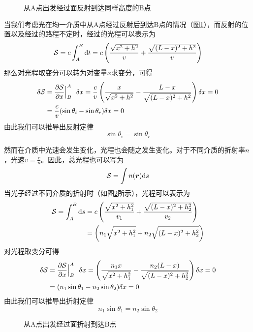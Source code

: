 \documentclass[12pt,openany]{book}
\begin{document}
\begin{figure}
   \centering 

\label{fig:refl}
\caption{从A点出发经过面反射到达同样高度的B点}
\end{figure}
当我们考虑光在均一介质中从A点经过反射后到达B点的情况（图\ref{fig:refl}），而反射的位置以及经过的路程不定时，经过的光程可以表示为
\begin{equation}
   \mathcal{S} = c\int_A^B \mathrm{d} t = c\left(\frac{\sqrt{x^2 + h^2}}{v} + \frac{\sqrt{(L-x)^2+h^2}}{v} \right)
\end{equation}
那么对光程取变分可以转为对变量$x$求变分，可得
\begin{equation}
   \begin{split}
   \delta\mathcal{S} &=\frac{\partial\mathcal{S}}{\partial x}\Big|^A_B ~~\delta x = \frac{c}{v}\left( \frac{x}{\sqrt{x^2 + h^2}} - \frac{L-x}{\sqrt{(L-x)^2+h^2}} \right)\delta x=0
   \\&=\frac{c}{v}(\sin\theta_i - \sin\theta_r)\delta x=0
   \end{split}
\end{equation}
由此我们可以推导出反射定律
\begin{equation}
   \sin\theta_i = \sin\theta_r
\end{equation}


然而在介质中光速会发生变化，光程也会随之发生变化。对于不同介质的折射率\(n\)，光速\(v=\frac{c}{n}\)。因此，总光程也可以写为
\begin{equation}
   \mathcal{S} = \int n(\boldsymbol{r})\mathrm{d} s\label{eq:fermat_n}
\end{equation}
当光子经过不同介质的折射时（如图\ref{fig:refr}所示），光程可以表示为
\begin{equation}
   \begin{split}
   \mathcal{S} = \int_A^B \mathrm{d} s &= c\left(\frac{\sqrt{x^2 + h_1^2}}{v_1} + \frac{\sqrt{(L-x)^2+h_2^2}}{v_2} \right) \\&= \left(n_1{\sqrt{x^2 + h_1^2}} + n_2{\sqrt{(L-x)^2+h_2^2}} \right)
   \end{split}
\end{equation}
对光程取变分可得
\begin{equation}
   \begin{split}
   \delta\mathcal{S} &=\frac{\partial\mathcal{S}}{\partial x}\Big|^A_B ~~\delta x = \left( \frac{n_1 x}{\sqrt{x^2 + h_1^2}} - \frac{n_2 (L-x)}{\sqrt{(L-x)^2+h_2^2}} \right)\delta x=0
   \\&= (n_1\sin\theta_1 - n_2\sin\theta_2)\delta x=0
   \end{split}
\end{equation}
由此我们可以推导出折射定律
\begin{equation}
   n_1\sin\theta_1 = n_2\sin\theta_2
\end{equation}
\begin{figure}
   \centering
\label{fig:refr}
\caption{从A点出发经过面折射到达B点}
\end{figure}
\end{document}
